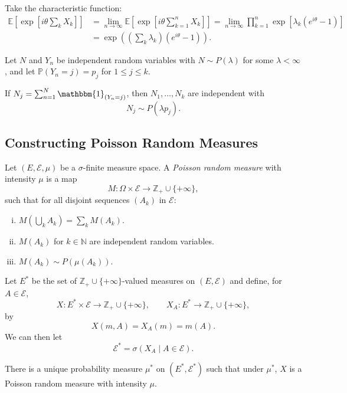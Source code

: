 \documentclass[12pt]{article}
\begin{document}
\begin{proofbox}
	Take the characteristic function:
	\begin{align*}
		\mathbb{E}\left[\exp \left[i \theta \sum_k X_k\right]\right] &= \lim_{n \to \infty} \mathbb{E}\left[ \exp \left[ i\theta \sum_{k = 1}^n X_k \right] \right] = \lim_{n \to \infty} \prod_{k = 1}^n \exp [\lambda_k (e^{i\theta} - 1 )] \\
									     &= \exp \left( \left( \sum_k \lambda_k \right) (e^{i\theta} - 1 ) \right).
	\end{align*}
\end{proofbox}

\begin{proposition}
	Let $N$ and $Y_n$ be independent random variables with $N \sim P(\lambda)$ for some $\lambda < \infty$, and let $\mathbb{P}(Y_n = j) = p_j$ for $1 \leq j \leq k$.

	If $N_j = \sum_{n = 1}^N \mathbbm{1}_{(Y_n = j)}$, then $N_1, \ldots, N_k$ are independent with
	\[
	N_j \sim P(\lambda p_j).
	\]
\end{proposition}

\subsection{Constructing Poisson Random Measures}%
\label{sub:conprm}

\begin{definition}
	Let $(E, \mathcal{E}, \mu)$ be a $\sigma$-finite measure space. A \emph{Poisson random measure} with intensity $\mu$ is a map
	\[
	M : \Omega \times \mathcal{E} \to \mathbb{Z}_+ \cup \{+\infty\},
	\]
	such that for all disjoint sequences $(A_k)$ in $\mathcal{E}$:
	\begin{enumerate}[(i)]
		\item $M(\bigcup_k A_k) = \sum_k M(A_k)$.
		\item $M(A_k)$ for $k \in \mathbb{N}$ are independent random variables.
		\item $M(A_k) \sim P(\mu(A_k))$.
	\end{enumerate}
\end{definition}

Let $E^{\ast}$ be the set of $\mathbb{Z}_+ \cup \{+\infty\}$-valued measures on $(E, \mathcal{E})$ and define, for $A \in \mathcal{E}$,
\[
	X : E^{\ast} \times \mathcal{E} \to \mathbb{Z}_+ \cup\{+\infty\}, \qquad X_A : E^{\ast} \to \mathbb{Z}_+ \cup\{+\infty\},
\]
by
\[
X(m, A) = X_A(m) = m(A).
\]
We can then let
\[
\mathcal{E}^{\ast} = \sigma(X_A \mid A \in \mathcal{E}).
\]
\begin{theorem}
	There is a unique probability measure $\mu^{\ast}$ on $(E^{\ast}, \mathcal{E}^{\ast})$ such that under $\mu^{\ast}$, $X$ is a Poisson random measure with intensity $\mu$.
\end{theorem}
\end{document}
